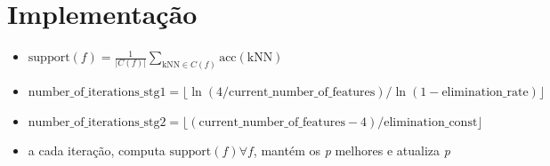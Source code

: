 \section{Implementação}

\begin{frame}
\begin{itemize}
    \item $ \text{support}(f) = \frac{1}{|C(f)|}\sum_{\text{kNN}\in{}C(f)}\text{acc}(\text{kNN}) $
    \item $ \text{number\_of\_iterations\_stg1} = \lfloor \ln(4/\text{current\_number\_of\_features}) / \ln(1-\text{elimination\_rate}) \rfloor $
    \item $ \text{number\_of\_iterations\_stg2} = \lfloor (\text{current\_number\_of\_features}-4)/\text{elimination\_const} \rfloor $
    \item a cada iteração, computa $ \text{support}(f) \forall f $, mantém os \textit{p} melhores e atualiza \textit{p}
\end{itemize}
\end{frame}
